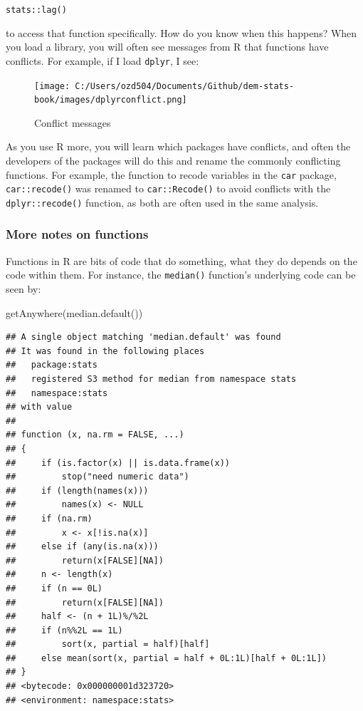 \documentclass[
]{book}
\newenvironment{Shaded}{\begin{snugshade}}{\end{snugshade}}
\newcommand{\FunctionTok}[1]{\textcolor[rgb]{0.00,0.00,0.00}{#1}}
\newcommand{\NormalTok}[1]{#1}
\begin{document}
\texttt{stats::lag()}

to access that function specifically. How do you know when this happens?
When you load a library, you will often see messages from R that
functions have conflicts. For example, if I load \texttt{dplyr}, I see:

\begin{figure}
\centering
\texttt{[image: C:/Users/ozd504/Documents/Github/dem-stats-book/images/dplyrconflict.png]}
\caption{Conflict
messages}
\end{figure}

As you use R more, you will learn which packages have conflicts, and
often the developers of the packages will do this and rename the
commonly conflicting functions. For example, the function to recode
variables in the \texttt{car} package, \texttt{car::recode()} was renamed to
\texttt{car::Recode()} to avoid conflicts with the \texttt{dplyr::recode()} function,
as both are often used in the same analysis.

\hypertarget{more-notes-on-functions}{%
\subsubsection{More notes on functions}\label{more-notes-on-functions}}

Functions in R are bits of code that do something, what they do depends
on the code within them. For instance, the \texttt{median()} function's
underlying code can be seen by:

\begin{Shaded}
\begin{Highlighting}[]
\FunctionTok{getAnywhere}\NormalTok{(}\FunctionTok{median.default}\NormalTok{())}
\end{Highlighting}
\end{Shaded}

\begin{verbatim}
## A single object matching 'median.default' was found
## It was found in the following places
##   package:stats
##   registered S3 method for median from namespace stats
##   namespace:stats
## with value
## 
## function (x, na.rm = FALSE, ...) 
## {
##     if (is.factor(x) || is.data.frame(x)) 
##         stop("need numeric data")
##     if (length(names(x))) 
##         names(x) <- NULL
##     if (na.rm) 
##         x <- x[!is.na(x)]
##     else if (any(is.na(x))) 
##         return(x[FALSE][NA])
##     n <- length(x)
##     if (n == 0L) 
##         return(x[FALSE][NA])
##     half <- (n + 1L)%/%2L
##     if (n%%2L == 1L) 
##         sort(x, partial = half)[half]
##     else mean(sort(x, partial = half + 0L:1L)[half + 0L:1L])
## }
## <bytecode: 0x000000001d323720>
## <environment: namespace:stats>
\end{verbatim}
\end{document}
